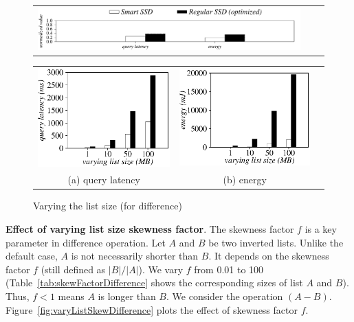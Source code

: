 \begin{figure}[hbtp]
  \centering
    \begin{tabular}{ccc}
 \includegraphics[width=0.52\columnwidth]{figures/banner2.pdf}
\end{tabular}
\vspace{-0.1cm}
\renewcommand{\tabcolsep}{0.1mm}
  \begin{tabular}{ccc}
 \includegraphics[width=0.5\columnwidth]{figures/Difference-time-VaryListLen.eps}&
  \includegraphics[width=0.5\columnwidth]{figures/Difference-energy-VaryListLen.eps}\\
  (a) query latency & (b) energy
\end{tabular}
  \caption{Varying the list size (for difference)}
  \label{fig:varyListSizeDifference}
 \end{figure}



\textbf{Effect of varying list size skewness factor}.
The skewness factor $f$ is a key parameter in \textsf{difference} operation.
Let $A$ and $B$ be two inverted lists. Unlike the default case, $A$ is not necessarily shorter than $B$. It depends on the skewness factor $f$ (still defined as $|B|/|A|$).
We vary $f$ from 0.01 to 100 (Table~\ref{tab:skewFactorDifference} shows the corresponding sizes of list $A$ and $B$). Thus, $f<1$ means $A$ is longer than $B$. We consider the operation $(A-B)$. Figure~\ref{fig:varyListSkewDifference} plots the effect of skewness factor $f$.


